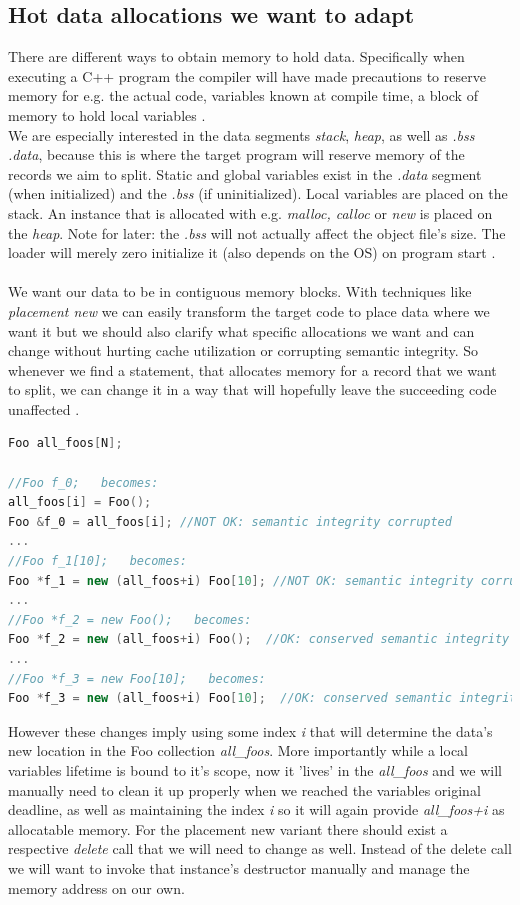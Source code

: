 \subsection{Hot data allocations we want to adapt}\label{hdawwta}
There are different ways to obtain memory to hold data. Specifically when executing a C++ program the compiler will have made precautions to reserve memory for e.g. the actual code, variables known at compile time, a block of memory to hold local variables .\\
We are especially interested in the data segments \textit{stack}, \textit{heap}, as well as \textit{.bss} \textit{.data}, because this is where the target program will reserve memory of the records we aim to split. Static and global variables exist in the \textit{.data} segment (when initialized) and the \textit{.bss} (if uninitialized). Local variables are placed on the stack. An instance that is allocated with e.g. \textit{malloc, calloc} or \textit{new} is placed on the \textit{heap}. Note for later: the \textit{.bss} will not actually affect the object file's size. The loader will merely zero initialize it (also depends on the OS) on program start .\\\\
We want our data to be in contiguous memory blocks. With techniques like \textit{placement new} we can easily transform the target code to place data where we want it but we should also clarify what specific allocations we want and can change without hurting cache utilization or corrupting semantic integrity. So whenever we find a statement, that allocates memory for a record that we want to split, we can change it in a way that will hopefully leave the succeeding code unaffected .
\begin{lstlisting}[language=C++,name={Examples of how we can change allocations using placement new to emplace the data where it is among related data.},label={alloc_changes}]
Foo all_foos[N];

//Foo f_0;   becomes:
all_foos[i] = Foo();
Foo &f_0 = all_foos[i]; //NOT OK: semantic integrity corrupted
...
//Foo f_1[10];   becomes:
Foo *f_1 = new (all_foos+i) Foo[10]; //NOT OK: semantic integrity corrupted
...
//Foo *f_2 = new Foo();   becomes:
Foo *f_2 = new (all_foos+i) Foo();  //OK: conserved semantic integrity
...
//Foo *f_3 = new Foo[10];   becomes:
Foo *f_3 = new (all_foos+i) Foo[10];  //OK: conserved semantic integrity
\end{lstlisting}
However these changes imply using some index \textit{i} that will determine the data's new location in the Foo collection \textit{all\_foos}. More importantly while a local variables lifetime is bound to it's scope, now it 'lives' in the \textit{all\_foos} and we will manually need to clean it up properly when we reached the variables original deadline, as well as maintaining the index \textit{i} so it will again provide \textit{all\_foos+i} as allocatable memory. For the placement new variant there should exist a respective \textit{delete} call that we will need to change as well. Instead of the delete call we will want to invoke that instance's destructor manually and manage the memory address on our own.\\
